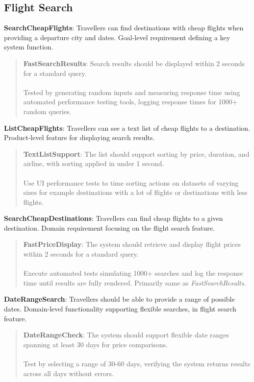 \subsection{Flight Search}
\textbf{SearchCheapFlights}: Travellers can find destinations with cheap flights when providing a departure city and dates. Goal-level requirement defining a key system function.
\begin{quote}
    \textbf{FastSearchResults}: Search results should be displayed within 2 seconds for a standard query.\\ \\ 
    Tested by generating random inputs and measuring response time using automated performance testing tools, logging response times for 1000+ random queries.
\end{quote}
\textbf{ListCheapFlights}: Travellers can see a text list of cheap flights to a destination. Product-level feature for displaying search results.
\begin{quote}
    \textbf{TextListSupport}: The list should support sorting by price, duration, and airline, with sorting applied in under 1 second.\\ \\ 
    Use UI performance tests to time sorting actions on datasets of varying sizes for example destinations with a lot of flights or destinations with less flights.
\end{quote}
\textbf{SearchCheapDestinations}: Travellers can find cheap flights to a given destination. Domain requirement focusing on the flight search feature.
\begin{quote}
    \textbf{FastPriceDisplay}: The system should retrieve and display flight prices within 2 seconds for a standard query.\\ \\
    Execute automated tests simulating 1000+ searches and log the response time until results are fully rendered. Primarily same as \textit{FastSearchResults}.
\end{quote}
\textbf{DateRangeSearch}: Travellers should be able to provide a range of possible dates. Domain-level functionality supporting flexible searches, in flight search feature.
\begin{quote}
    \textbf{DateRangeCheck}: The system should support flexible date ranges spanning at least 30 days for price comparisons. \\ \\
    Test by selecting a range of 30-60 days, verifying the system returns results across all days without errors.
\end{quote}
